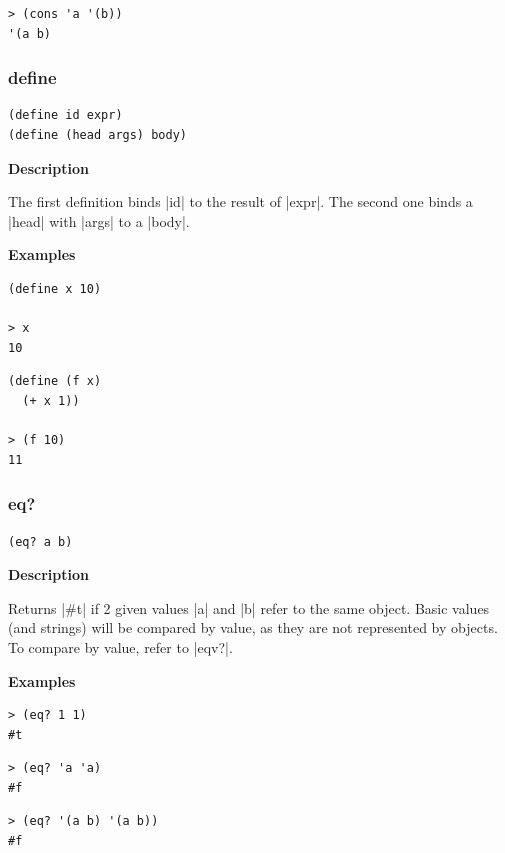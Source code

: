 \documentclass[a4paper]{article}
\begin{document}
\begin{lstlisting}
> (cons 'a '(b))
'(a b)
\end{lstlisting}

\subsubsection{define}

\begin{lstlisting}[frame=none]
(define id expr)
(define (head args) body)
\end{lstlisting}

\textbf{Description}

The first definition binds |id| to the result of |expr|. The second one binds a |head| with |args| to a |body|.

\textbf{Examples}

\begin{lstlisting}
(define x 10)

> x
10
\end{lstlisting}

\begin{lstlisting}
(define (f x)
  (+ x 1))
  
> (f 10)
11
\end{lstlisting}


\subsubsection{eq?}

\begin{lstlisting}[frame=none]
(eq? a b)
\end{lstlisting}

\textbf{Description}

Returns |#t| if 2 given values |a| and |b| refer to the same object. Basic values (and strings) will be compared by value, as they are not represented by objects. To compare by value, refer to |eqv?|.

\textbf{Examples}

\begin{lstlisting}
> (eq? 1 1)
#t
\end{lstlisting}

\begin{lstlisting}
> (eq? 'a 'a)
#f
\end{lstlisting}

\begin{lstlisting}
> (eq? '(a b) '(a b))
#f
\end{lstlisting}
\end{document}
